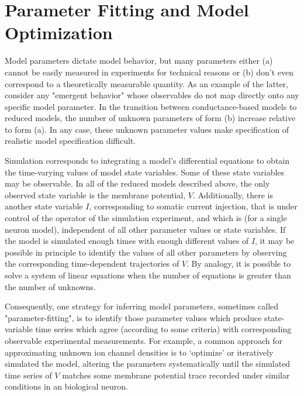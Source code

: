 \section{Parameter Fitting and Model Optimization}
Model parameters dictate model behavior, but many parameters either (a) cannot be easily measured in experiments for technical reasons or (b) don't even correspond to a theoretically measurable quantity.
As an example of the latter, consider any "emergent behavior" whose observables do not map directly onto any specific model parameter.
In the transition between conductance-based models to reduced models, the number of unknown parameters of form (b) increase relative to form (a).
In any case, these unknown parameter values make specification of realistic model specification difficult.

Simulation corresponds to integrating a model's differential equations to obtain the time-varying values of model state variables.
Some of these state variables may be observable.
In all of the reduced models described above, the only observed state variable is the membrane potential, $V$.
Additionally, there is another state variable $I$, corresponding to somatic current injection, that is under control of the operator of the simulation experiment, and which is (for a single neuron model), independent of all other parameter values or state variables.
If the model is simulated enough times with enough different values of $I$, it may be possible in principle to identify the values of all other parameters by observing the corresponding time-dependent trajectories of $V$.
By analogy, it is possible to solve a system of linear equations when the number of equations is greater than the number of unknowns.

Consequently, one strategy for inferring model parameters, sometimes called "parameter-fitting", is to identify those parameter values which produce state-variable time series which agree (according to some criteria) with corresponding observable experimental measurements.
For example, a common approach for approximating unknown ion channel densities is to ‘optimize’ or iteratively simulated the model, altering the parameters systematically until the simulated time series of $V$ matches some membrane potential trace recorded under similar conditions in an biological neuron.

